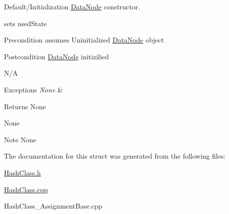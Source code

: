 Default/\+Initialization \hyperlink{struct_data_node}{Data\+Node} constructor. 

sets used\+State

\begin{DoxyPrecond}{Precondition}
assumes Uninitialized \hyperlink{struct_data_node}{Data\+Node} object
\end{DoxyPrecond}
\begin{DoxyPostcond}{Postcondition}
\hyperlink{struct_data_node}{Data\+Node} initizilied
\end{DoxyPostcond}
\begin{DoxyParagraph}{N/\+A}

\end{DoxyParagraph}

\begin{DoxyExceptions}{Exceptions}
{\em None} & \\
\hline
\end{DoxyExceptions}
\begin{DoxyReturn}{Returns}
None
\end{DoxyReturn}
None

\begin{DoxyNote}{Note}
None 
\end{DoxyNote}


The documentation for this struct was generated from the following files\+:\begin{DoxyCompactItemize}
\item 
\hyperlink{_hash_class_8h}{Hash\+Class.\+h}\item 
\hyperlink{_hash_class_8cpp}{Hash\+Class.\+cpp}\item 
Hash\+Class\+\_\+\+Assignment\+Base.\+cpp\end{DoxyCompactItemize}
